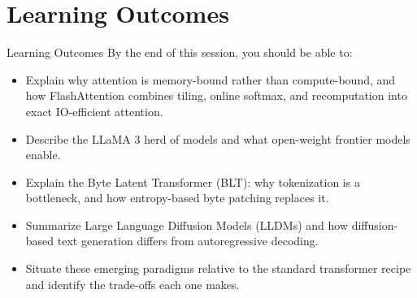 \section{Learning Outcomes}
\begin{frame}{Learning Outcomes}
    By the end of this session, you should be able to:
    \begin{itemize}
        \setlength{\itemsep}{1em}
        \item Explain why attention is memory-bound rather than compute-bound, and how FlashAttention combines tiling, online softmax, and recomputation into exact IO-efficient attention.
        \item Describe the LLaMA 3 herd of models and what open-weight frontier models enable.
        \item Explain the Byte Latent Transformer (BLT): why tokenization is a bottleneck, and how entropy-based byte patching replaces it.
        \item Summarize Large Language Diffusion Models (LLDMs) and how diffusion-based text generation differs from autoregressive decoding.
        \item Situate these emerging paradigms relative to the standard transformer recipe and identify the trade-offs each one makes.
    \end{itemize}
\end{frame}
